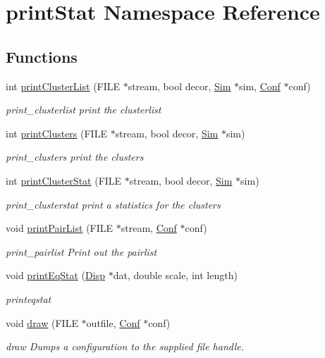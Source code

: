\hypertarget{namespaceprint_stat}{\section{print\+Stat Namespace Reference}
\label{namespaceprint_stat}
}
\subsection*{Functions}
\begin{DoxyCompactItemize}
\item 
int \hyperlink{namespaceprint_stat_a14daf62b11779bc1d5703953c7fe6c5e}{print\+Cluster\+List} (F\+I\+L\+E $\ast$stream, bool decor, \hyperlink{class_sim}{Sim} $\ast$sim, \hyperlink{class_conf}{Conf} $\ast$conf)
\begin{DoxyCompactList}\small\item\em print\+\_\+clusterlist print the clusterlist \end{DoxyCompactList}\item 
int \hyperlink{namespaceprint_stat_a677d67d06c5e94575cf134f62b8931ca}{print\+Clusters} (F\+I\+L\+E $\ast$stream, bool decor, \hyperlink{class_sim}{Sim} $\ast$sim)
\begin{DoxyCompactList}\small\item\em print\+\_\+clusters print the clusters \end{DoxyCompactList}\item 
int \hyperlink{namespaceprint_stat_a0b43e80734258424961c75c73a97ad6c}{print\+Cluster\+Stat} (F\+I\+L\+E $\ast$stream, bool decor, \hyperlink{class_sim}{Sim} $\ast$sim)
\begin{DoxyCompactList}\small\item\em print\+\_\+clusterstat print a statistics for the clusters \end{DoxyCompactList}\item 
void \hyperlink{namespaceprint_stat_a323ee54f7e5beb4c642569cb07aa37ce}{print\+Pair\+List} (F\+I\+L\+E $\ast$stream, \hyperlink{class_conf}{Conf} $\ast$conf)
\begin{DoxyCompactList}\small\item\em print\+\_\+pairlist Print out the pairlist \end{DoxyCompactList}\item 
void \hyperlink{namespaceprint_stat_a8170440b42d61f528a874c4d763609f7}{print\+Eq\+Stat} (\hyperlink{class_disp}{Disp} $\ast$dat, double scale, int length)
\begin{DoxyCompactList}\small\item\em printeqstat \end{DoxyCompactList}\item 
void \hyperlink{namespaceprint_stat_a07c0632a1accc08bdfc3990a9110e95b}{draw} (F\+I\+L\+E $\ast$outfile, \hyperlink{class_conf}{Conf} $\ast$conf)
\begin{DoxyCompactList}\small\item\em draw Dumps a configuration to the supplied file handle. \end{DoxyCompactList}\end{DoxyCompactItemize}


